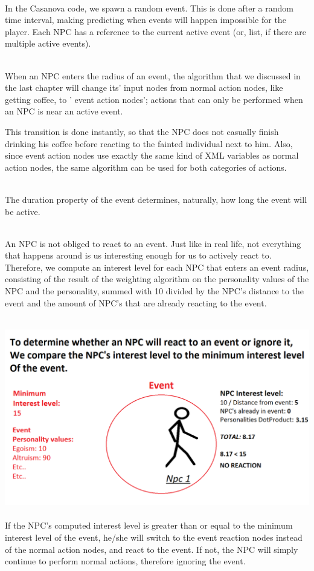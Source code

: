 \documentclass[11pt]{article} %
\begin{document}
~\\
In the Casanova code, we spawn a random event. This is done after a random time interval, making predicting when events will happen impossible for the player. Each NPC has a reference to the current active event (or, list, if there are multiple active events).

~\\
When an NPC enters the radius of an event, the algorithm that we discussed in the last chapter will change its' input nodes from normal action nodes, like getting coffee, to ' event action nodes'; actions that can only be performed when an NPC is near an active event.



\newpage
This transition is done instantly, so that the NPC does not casually finish drinking his coffee before reacting to the fainted individual next to him. Also, since event action nodes use exactly the same kind of XML variables as normal action nodes, the same algorithm can be used for both categories of actions. 

~\\
The duration property of the event determines, naturally, how long the event will be active.

~\\
An NPC is not obliged to react to an event. Just like in real life, not everything that happens around is us interesting enough for us to actively react to. Therefore, we compute an interest level for each NPC that enters an event radius, consisting of the result of the weighting algorithm on the personality values of the NPC and the personality, summed with 10 divided by the NPC's distance to the event and the amount of NPC's that are already reacting to the event.

~\\
\includegraphics[scale=0.4]{InterestLevel}
~\\
 If the NPC's computed interest level is greater than or equal to the minimum interest level of the event, he/she will switch to the event reaction nodes instead of the normal action nodes, and react to the event. If not, the NPC will simply continue to perform normal actions, therefore ignoring the event.
\end{document}
